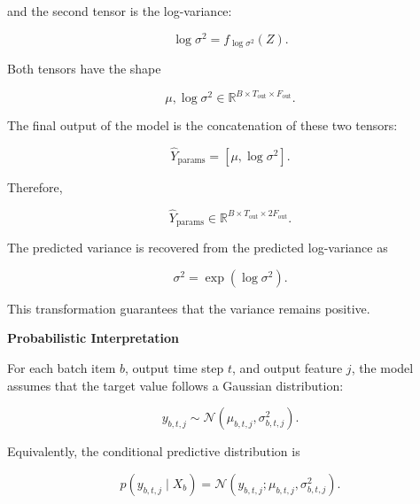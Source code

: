 \documentclass{book}
\providecommand{\ProjectDeepHeading}[2]{%
    \par\medskip\noindent\textbf{#2}\par\smallskip
}
\begin{document}
        and the second tensor is the log-variance:
        
        \[
            \log \ensuremath{\sigma}^2
            =
            f_{\log \ensuremath{\sigma}^2}
            \left(
                Z
            \right).
        \]
        
        Both tensors have the shape
        
        \[
            \ensuremath{\mu},
            \log \ensuremath{\sigma}^2
            \in
            \mathbb{R}^{B \times T_{\mathrm{out}} \times F_{\mathrm{out}}}.
        \]
        
        The final output of the model is the concatenation of these two tensors:
        
        \[
            \hat{Y}_{\mathrm{params}}
            =
            \left[
                \ensuremath{\mu},
                \log \ensuremath{\sigma}^2
            \right].
        \]
        
        Therefore,
        
        \[
            \hat{Y}_{\mathrm{params}}
            \in
            \mathbb{R}^{B \times T_{\mathrm{out}} \times 2F_{\mathrm{out}}}.
        \]
        
        The predicted variance is recovered from the predicted log-variance as
        
        \[
            \ensuremath{\sigma}^2
            =
            \exp
            \left(
                \log \ensuremath{\sigma}^2
            \right).
        \]
        
        This transformation guarantees that the variance remains positive.
    
    
    \ProjectDeepHeading{8}{Probabilistic Interpretation}
        
        For each batch item \(b\), output time step \(t\), and output feature \(j\), the model assumes that the target value follows a Gaussian distribution:
        
        \[
            y_{b,t,j}
            \sim
            \mathcal{N}
            \left(
                \ensuremath{\mu}_{b,t,j},
                \ensuremath{\sigma}^2_{b,t,j}
            \right).
        \]
        
        Equivalently, the conditional predictive distribution is
        
        \[
            p
            \left(
                y_{b,t,j}
                \mid
                X_b
            \right)
            =
            \mathcal{N}
            \left(
                y_{b,t,j};
                \ensuremath{\mu}_{b,t,j},
                \ensuremath{\sigma}^2_{b,t,j}
            \right).
        \]
        
\end{document}

